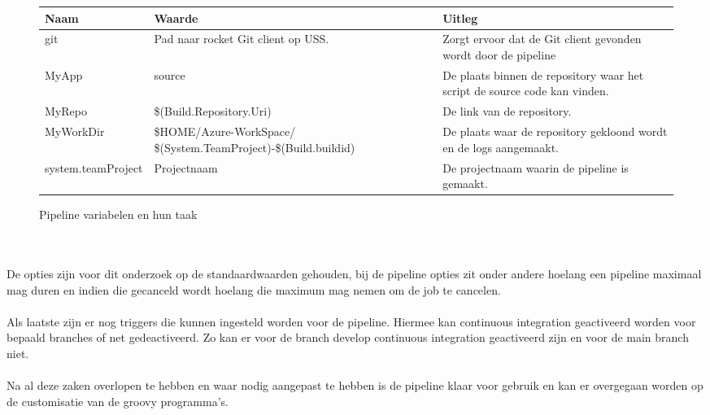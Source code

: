 \begin{figure}[h]
    \begin{tabularx}{1\textwidth} { 
            | >{\centering\arraybackslash}X 
            | >{\centering\arraybackslash}X 
            | >{\centering\arraybackslash}X  | }
        \hline
        \textbf{Naam} & 
        \textbf{Waarde} & 
        \textbf{Uitleg} \\
        \hline
        git &
        Pad naar rocket Git client op USS. &
        Zorgt ervoor dat de Git client gevonden wordt door de pipeline \\ 
        \hline
        MyApp &
        source &
        De plaats binnen de repository waar het script de source code kan vinden. \\ 
        \hline
        MyRepo &
        \$(Build.Repository.Uri) &
        De link van de repository. \\ 
        \hline
        MyWorkDir &
        \$HOME/Azure-WorkSpace/ \$(System.TeamProject)-\$(Build.buildid) &
        De plaats waar de repository gekloond wordt en de logs aangemaakt. \\ 
        \hline
        system.teamProject &
        Projectnaam &
        De projectnaam waarin de pipeline is gemaakt. \\ 
        \hline
    \end{tabularx}
    \caption{Pipeline variabelen en hun taak}
    \label{tab:soorten pipeline variabelen}
\end{figure}
\\ \\
De opties zijn voor dit onderzoek op de standaardwaarden gehouden, bij de pipeline opties zit onder andere hoelang een pipeline maximaal mag duren en indien die gecanceld wordt hoelang die maximum mag nemen om de job te cancelen.  
\\ \\
Als laatste zijn er nog triggers die kunnen ingesteld worden voor de pipeline. Hiermee kan continuous integration geactiveerd worden voor bepaald branches of net gedeactiveerd. Zo kan er voor de branch develop continuous integration geactiveerd zijn en voor de main branch niet. 
\\ \\
Na al deze zaken overlopen te hebben en waar nodig aangepast te hebben is de pipeline klaar voor gebruik en kan er overgegaan worden op de customisatie van de groovy programma's. 

